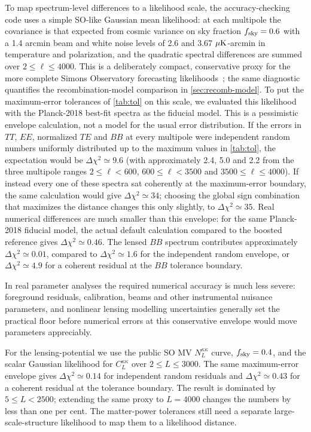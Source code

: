 \documentclass[prd, twocolumn, superscriptaddress, tightenlines, longbibliography, nofootinbib, eqsecnum, amsfonts, amsmath, floatfix, notitlepage]{revtex4-2}
\newcommand{\code}[1]{\texttt{\detokenize{#1}}}
\begin{document}
To map spectrum-level differences to a likelihood scale, the accuracy-checking
code uses a simple SO-like Gaussian mean likelihood: at each multipole the
covariance is that expected from cosmic variance on sky fraction
$f_{\rm sky}=0.6$ with a 1.4 arcmin beam and white noise levels of 2.6 and
3.67 $\mu{\rm K}$-arcmin in temperature and polarization, and the quadratic
spectral differences are summed over $2\le \ell\le4000$. This is a deliberately
compact, conservative proxy for the more complete Simons Observatory
forecasting likelihoods~\cite{SO:2018sim,SOEnhancedLAT:2025}; the same
diagnostic quantifies the recombination-model comparison in
\cref{sec:recomb-model}. To put the maximum-error tolerances of \cref{tab:tol}
on this scale, we evaluated this likelihood with the Planck-2018 best-fit
spectra as the fiducial model. This is a pessimistic envelope calculation, not
a model for the usual error distribution. If the errors in $TT$, $EE$, normalized $TE$ and
$BB$ at every multipole were independent random numbers uniformly distributed up
to the maximum values in \cref{tab:tol}, the expectation would be
$\Delta\chi^2\simeq9.6$ (with approximately 2.4, 5.0 and 2.2 from the three
multipole ranges $2\le\ell<600$, $600\le\ell<3500$ and
$3500\le\ell\le4000$). If instead every one of these spectra sat coherently at
the maximum-error boundary, the same calculation would give
$\Delta\chi^2\simeq34$; choosing the global sign combination that maximizes the
distance changes this only slightly, to $\Delta\chi^2\simeq35$. Real numerical
differences are much smaller than this envelope: for the same Planck-2018
fiducial model, the actual default calculation compared to the boosted
\code{check_accuracy} reference gives $\Delta\chi^2\simeq0.46$.
The lensed $BB$ spectrum contributes approximately  $\Delta\chi^2\simeq0.01$,
compared to $\Delta\chi^2\simeq1.6$ for the independent random envelope, or
$\Delta\chi^2\simeq4.9$ for a coherent residual at the $BB$ tolerance boundary.

In real parameter analyses the required numerical accuracy is much less severe:
foreground residuals, calibration, beams and other instrumental nuisance
parameters, and nonlinear lensing modelling uncertainties generally set the
practical floor before numerical errors at this conservative envelope would move
parameters appreciably.

For the lensing-potential we use the public SO MV $N_L^{\kappa\kappa}$ curve,
$f_{\rm sky}=0.4$, and the scalar Gaussian likelihood for $C_L^{\kappa\kappa}$
over $2\le L\le3000$. The same maximum-error envelope gives
$\Delta\chi^2\simeq0.14$ for independent random residuals and
$\Delta\chi^2\simeq0.43$ for a coherent residual at the tolerance boundary. The
result is dominated by $5\le L<2500$; extending the same proxy to $L=4000$
changes the numbers by less than one per cent. The matter-power tolerances still
need a separate large-scale-structure likelihood to map them to a likelihood
distance.
\end{document}
